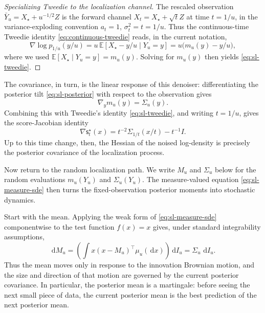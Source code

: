 \documentclass{amsart}
\numberwithin{equation}{section}
\theoremstyle{plain}
\theoremstyle{definition}
\theoremstyle{remark}
\newcommand{\E}{\mathbb{E}}
\newcommand{\dd}{\,\mathrm{d}}
\newcommand{\Id}{I}
\newcommand{\sstar}{\mathsf{s}^{\star}}
\begin{document}
\begin{proof}[Specializing Tweedie to the localization channel]
The rescaled observation $\bar Y_u=X_\star+u^{-1/2}Z$ is the forward channel
$X_t=X_\star+\sqrt{t}Z$ at time $t=1/u$, in the variance-exploding convention
$a_t=1$, $\sigma_t^2=t=1/u$.  Thus the continuous-time Tweedie identity
\eqref{eq:continuous-tweedie} reads, in the current notation,
\[
    \nabla\log p_{1/u}(y/u)
    =
    u\,\E[X_\star-y/u\mid Y_u=y]
    =
    u\bigl(m_u(y)-y/u\bigr),
\]
where we used $\E[X_\star\mid Y_u=y]=m_u(y)$.  Solving for $m_u(y)$ then yields
\eqref{eq:sl-tweedie}.
\end{proof}

The covariance, in turn, is the linear response of this denoiser:
differentiating the posterior tilt \eqref{eq:sl-posterior} with respect to the
observation gives
\begin{equation}\label{eq:posterior-mean-jacobian}
    \nabla_y m_u(y)=\Sigma_u(y).
\end{equation}
Combining this with Tweedie's identity \eqref{eq:sl-tweedie}, and writing
$t=1/u$, gives the score-Jacobian identity
\begin{equation}\label{eq:score-hessian-covariance}
    \nabla \sstar_t(x)
    =
    t^{-2}\Sigma_{1/t}(x/t)
    -
    t^{-1}\Id.
\end{equation}
Up to this time change, then, the Hessian of the noised log-density is precisely
the posterior covariance of the localization process.

Now return to the random localization path. We write
$M_u$ and $\Sigma_u$ below for the random evaluations
$m_u(Y_u)$ and $\Sigma_u(Y_u)$.  The measure-valued equation
\eqref{eq:sl-measure-sde} then turns the fixed-observation posterior moments
into stochastic dynamics.

Start with the mean.  Applying the weak form of
\eqref{eq:sl-measure-sde} componentwise to the test function $f(x)=x$ gives,
under standard integrability assumptions,
\begin{equation}\label{eq:sl-mean-sde}
    \dd M_u
    =
    \left(\int x(x-M_u)^\top \mu_u(\dd x)\right)\dd I_u
    =
    \Sigma_u\,\dd I_u.
\end{equation}
Thus the mean moves only in response to the innovation Brownian motion, and
the size and direction of that motion are governed by the current posterior
covariance.  In particular, the posterior mean is a martingale: before seeing
the next small piece of data, the current posterior mean is the best prediction
of the next posterior mean.
\end{document}
